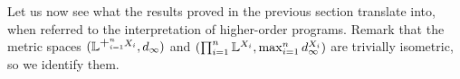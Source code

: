 %

Let us now see what the results proved in the previous section translate into, when referred to the interpretation of higher-order programs.
Remark that the metric spaces $(\Lawv^{\mathlarger{+}_{i=1}^n X_i},d_{\infty})$ and $(\prod_{i=1}^n \mathbb{L}^{X_i},\max_{i=1}^n d^{X_i}_\infty)$ are trivially isometric, so we identify them.



